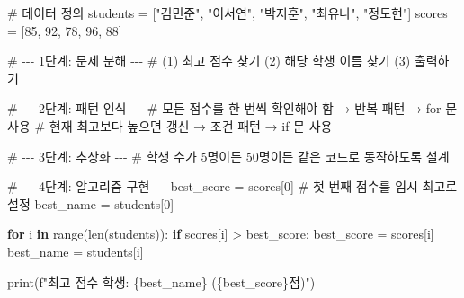 \documentclass[
  korean,
  11pt,
  a4paper,
  DIV=11,
  numbers=noendperiod]{scrreprt}
\newenvironment{Shaded}{\begin{snugshade}}{\end{snugshade}}
\newcommand{\BuiltInTok}[1]{\textcolor[rgb]{0.00,0.23,0.31}{#1}}
\newcommand{\CommentTok}[1]{\textcolor[rgb]{0.37,0.37,0.37}{#1}}
\newcommand{\ControlFlowTok}[1]{\textcolor[rgb]{0.00,0.23,0.31}{\textbf{#1}}}
\newcommand{\DecValTok}[1]{\textcolor[rgb]{0.68,0.00,0.00}{#1}}
\newcommand{\KeywordTok}[1]{\textcolor[rgb]{0.00,0.23,0.31}{\textbf{#1}}}
\newcommand{\NormalTok}[1]{\textcolor[rgb]{0.00,0.23,0.31}{#1}}
\newcommand{\OperatorTok}[1]{\textcolor[rgb]{0.37,0.37,0.37}{#1}}
\newcommand{\SpecialCharTok}[1]{\textcolor[rgb]{0.37,0.37,0.37}{#1}}
\newcommand{\SpecialStringTok}[1]{\textcolor[rgb]{0.13,0.47,0.30}{#1}}
\newcommand{\StringTok}[1]{\textcolor[rgb]{0.13,0.47,0.30}{#1}}
\begin{document}
\begin{Shaded}
\begin{Highlighting}[]
\CommentTok{\# 데이터 정의}
\NormalTok{students }\OperatorTok{=}\NormalTok{ [}\StringTok{"김민준"}\NormalTok{, }\StringTok{"이서연"}\NormalTok{, }\StringTok{"박지훈"}\NormalTok{, }\StringTok{"최유나"}\NormalTok{, }\StringTok{"정도현"}\NormalTok{]}
\NormalTok{scores   }\OperatorTok{=}\NormalTok{ [}\DecValTok{85}\NormalTok{, }\DecValTok{92}\NormalTok{, }\DecValTok{78}\NormalTok{, }\DecValTok{96}\NormalTok{, }\DecValTok{88}\NormalTok{]}

\CommentTok{\# {-}{-}{-} 1단계: 문제 분해 {-}{-}{-}}
\CommentTok{\# (1) 최고 점수 찾기  (2) 해당 학생 이름 찾기  (3) 출력하기}

\CommentTok{\# {-}{-}{-} 2단계: 패턴 인식 {-}{-}{-}}
\CommentTok{\# 모든 점수를 한 번씩 확인해야 함 → 반복 패턴 → for 문 사용}
\CommentTok{\# 현재 최고보다 높으면 갱신 → 조건 패턴 → if 문 사용}

\CommentTok{\# {-}{-}{-} 3단계: 추상화 {-}{-}{-}}
\CommentTok{\# 학생 수가 5명이든 50명이든 같은 코드로 동작하도록 설계}

\CommentTok{\# {-}{-}{-} 4단계: 알고리즘 구현 {-}{-}{-}}
\NormalTok{best\_score }\OperatorTok{=}\NormalTok{ scores[}\DecValTok{0}\NormalTok{]      }\CommentTok{\# 첫 번째 점수를 임시 최고로 설정}
\NormalTok{best\_name  }\OperatorTok{=}\NormalTok{ students[}\DecValTok{0}\NormalTok{]}

\ControlFlowTok{for}\NormalTok{ i }\KeywordTok{in} \BuiltInTok{range}\NormalTok{(}\BuiltInTok{len}\NormalTok{(students)):}
    \ControlFlowTok{if}\NormalTok{ scores[i] }\OperatorTok{\textgreater{}}\NormalTok{ best\_score:}
\NormalTok{        best\_score }\OperatorTok{=}\NormalTok{ scores[i]}
\NormalTok{        best\_name  }\OperatorTok{=}\NormalTok{ students[i]}

\BuiltInTok{print}\NormalTok{(}\SpecialStringTok{f"최고 점수 학생: }\SpecialCharTok{\{}\NormalTok{best\_name}\SpecialCharTok{\}}\SpecialStringTok{ (}\SpecialCharTok{\{}\NormalTok{best\_score}\SpecialCharTok{\}}\SpecialStringTok{점)"}\NormalTok{)}
\end{Highlighting}
\end{Shaded}
\end{document}
